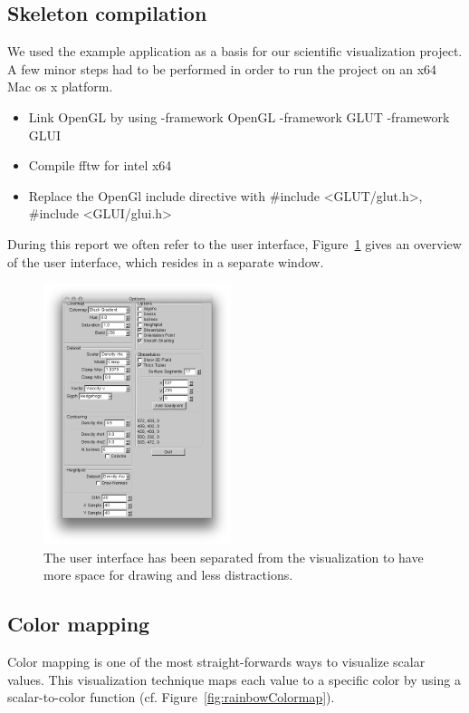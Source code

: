 \subsection{Skeleton compilation}
\label{sec:skeletonCompilation}


We used the example application as a basis for our scientific visualization project. A few minor steps had to be performed in order to run the project on an x64 Mac os x platform. 

\begin{itemize}
    \item Link OpenGL by using -framework OpenGL -framework GLUT -framework GLUI
    \item Compile fftw for intel x64
    \item Replace the OpenGl include directive with \#include \textless GLUT/glut.h\textgreater, \#include \textless GLUI/glui.h\textgreater{}
    \end{itemize}

During this report we often refer to the user interface,  Figure~\ref{fig:figures_00interface} gives an overview of the user interface, which resides in a separate window.

\begin{figure}[htbp]
    \centering
        \includegraphics[height=3in]{figures/00interface.png}
    \caption{The user interface has been separated from the visualization to have more space for drawing and less distractions.}
    \label{fig:figures_00interface}
\end{figure}

\clearpage
\subsection{Color mapping}
\label{sec:colorMapping}
Color mapping is one of the most straight-forwards ways to visualize scalar values. This visualization technique maps each value to a specific color by using a scalar-to-color function (cf. Figure~\ref{fig:rainbowColormap}). 

